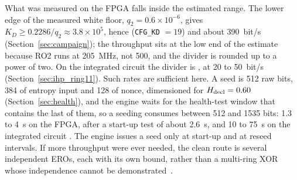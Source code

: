 What was measured on the \ac{FPGA} falls inside the estimated range. The
lower edge of the measured white floor,
$q_2 = 0.6\times10^{-6}$, gives $K_D \ge 0.2286 / q_2 \approx
3.8\times10^{5}$, hence  (\texttt{CFG\_KD} $= 19$) and about
390~bit/s \meas{} (Section~\ref{sec:campaign}); the throughput sits at
the low end of the estimate because RO2 runs at 205~MHz, not 500, and
the divider is rounded up to a power of two. On
the integrated circuit the divider is , at 20 to 50~bit/s \est{}
(Section~\ref{sec:ihp_ring11}). Such rates are sufficient here. A seed is
512 raw bits, 384 of entropy input and 128 of nonce, dimensioned for
$H_{\mathrm{decl}} = 0.60$ (Section~\ref{sec:health}), and the engine waits for the
health-test window that contains the last of them, so a seeding consumes
between 512 and 1535 bits: 1.3 to 4~s on the \ac{FPGA}, after a start-up
test of about 2.6~s, and 10 to 75~s on the integrated circuit \est{}. The
engine issues a seed only at start-up and at reseed intervals. If more throughput were ever
needed, the clean route is several independent \acp{ERO}, each with its
own bound, rather than a multi-ring XOR whose independence cannot be
demonstrated~\cite{bochard_2010_true}.
